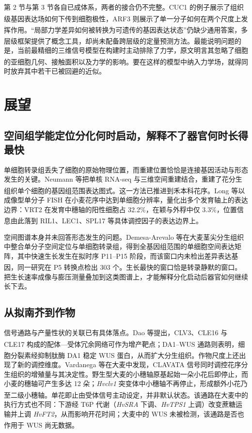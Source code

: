 \documentclass[11pt,a4paper]{ctexart}
\begin{document}
第 2 节与第 3 节各自已成体系，两者的接合仍不完整。CUC1 的例子展示了组织级基因表达场如何下传到细胞极性\textsuperscript{\cite{ref13}}，ARF3 则展示了单一分子如何在两个尺度上发挥作用\textsuperscript{\cite{ref12}}。“局部力学差异如何被转换为可遗传的基因表达状态”仍缺少通用答案，多层级框架提供了概念工具，却尚未配备跨层级的定量预测方法\textsuperscript{\cite{ref19}}。最能说明问题的是，当前最精细的三维信号模型在构建时主动排除了力学，原文明言其忽略了细胞的亚细胞几何、接触面积以及力学的影响\textsuperscript{\cite{ref7}}。要在这样的模型中纳入力学场，就得同时放弃其中若干已被回避的近似。

\section{展望}

\subsection{空间组学能定位分化何时启动，解释不了器官何时长得最快}

单细胞转录组丢失了细胞的原始物理位置，而重建位置恰恰是连接基因活动与形态发生的关键。Neumann 等把单核 RNA-seq 与三维空间重建结合，重建了花分生组织单个细胞的基因组范围表达图式\textsuperscript{\cite{ref20}}。这一方法已推进到禾本科花序。Long 等以成像型单分子 FISH 在小麦花序中达到单细胞分辨率，量化出多个发育轴上的表达边界：VRT2 在发育中穗轴的阳性细胞占 32.2\%，在颖与外稃中仅 3.3\%，位置信息由此落到 RIL1、LEC1、SPL17 等具体调控因子的表达边界上\textsuperscript{\cite{ref21}}。

空间图谱本身并未回答形态发生的问题。Demesa-Arevalo 等在大麦茎尖分生组织中整合单分子空间定位与单细胞转录组，得到全基因组范围的单细胞空间表达矩阵，其中快速生长发生在拟时序 P11–P15 阶段，而该窗口内未检出差异表达基因，同一研究在 P5 转换点检出 303 个\textsuperscript{\cite{ref22}}。生长最快的窗口恰是转录静默的窗口。把生长速率成像与膨压测量叠加到这类图谱上，才能解释分化启动后器官如何继续长下去。

\subsection{从拟南芥到作物}

信号通路与产量性状的关联已有具体落点。Dao 等提出，CLV3、CLE16 与 CLE17 构成的配体—受体冗余网络可作为增产靶点\textsuperscript{\cite{ref5}}；DA1–WUS 通路则表明，细胞分裂素经抑制肽酶 DA1 稳定 WUS 蛋白，从而扩大分生组织\textsuperscript{\cite{ref1}}。作物尺度上还出现了新的调控维度。Vardanega 等在大麦中发现，CLAVATA 信号同时调控花序分生组织的增殖量与其决定性。野生型大麦的小穗轴原基起始一朵小花后即停止，而小麦的穗轴可产生多达 12 朵；\textit{Hvclv1} 突变体中小穗轴不再停止，形成额外小花乃至二级小穗轴\textsuperscript{\cite{ref23}}。单花即止由受体信号主动设定，并非默认状态。该通路在大麦中的执行方式也不同：下游经 T6P 代谢（\textit{HvSRA} 下调、\textit{HvTPS1} 上调）改变蔗糖运输并上调 \textit{HvFT2}，从而影响开花时间；大麦中的 WUS 未被检测，该通路是否也作用于 WUS 尚无数据\textsuperscript{\cite{ref23}}。
\end{document}
